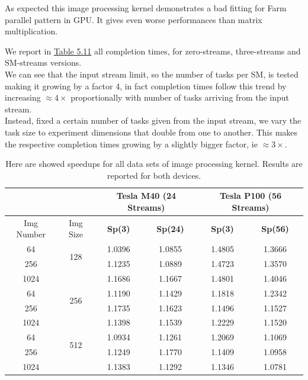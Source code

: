 As expected this image processing kernel demonstrates a bad fitting for Farm parallel pattern in GPU. It gives even worse performances than matrix multiplication.

We report in \hyperref[tab:imgavgs]{Table 5.11} all completion times, for zero-streams, three-streams and SM-streams versions.\\
We can see that the input stream limit, so the number of tasks per SM, is tested making it growing by a factor 4, in fact completion times follow this trend by increasing \(\approx4\times\) proportionally with number of tasks arriving from the input stream.\\
Instead, fixed a certain number of tasks given from the input stream, we vary the task size to experiment dimensions that double from one to another. This makes the respective completion times growing by a slightly bigger factor, ie \(\approx3\times\).


\begin{table}	
	\centering
	\begin{tabular}{ | c  c || c | c  || c | c || } 
		\hline
		& &  \multicolumn{2}{c}{\textbf{Tesla M40 (24 Streams)}}& \multicolumn{2}{c}{\textbf{Tesla P100 (56 Streams)}} \\ [0.5ex]
		\hline		
		Img Number &	Img Size&	\textbf{Sp(3)} & \textbf{Sp(24)} &	\textbf{Sp(3)} &	\textbf{Sp(56)}\\
		\hline	\hline	
		64&	\multirow{2}{*}{128}&	1.0396&	1.0855&	1.4805&	1.3666\\
		256&	&	1.1235&	1.0889&	1.4723&	1.3570\\
		1024&	&	1.1686&	1.1667&	1.4801&	1.4046\\
		64&	\multirow{2}{*}{256}&	1.1190&	1.1429&	1.1818&	1.2342\\
		256&	&	1.1735&	1.1623&	1.1496&	1.1527\\
		1024&	&	1.1398&	1.1539&	1.2229&	1.1520\\
		64&	\multirow{2}{*}{512}&	1.0934&	1.1261&	1.2069&	1.1069\\
		256&	&	1.1249&	1.1770&	1.1409&	1.0958\\
		1024&	&	1.1383&	1.1292&	1.1346&	1.0781\\
		\hline
	\end{tabular}
	\caption{Here are showed speedups for all data sets of image processing kernel. Results are reported for both devices.}	
	\label{tab:imgspeedup}		
\end{table}


